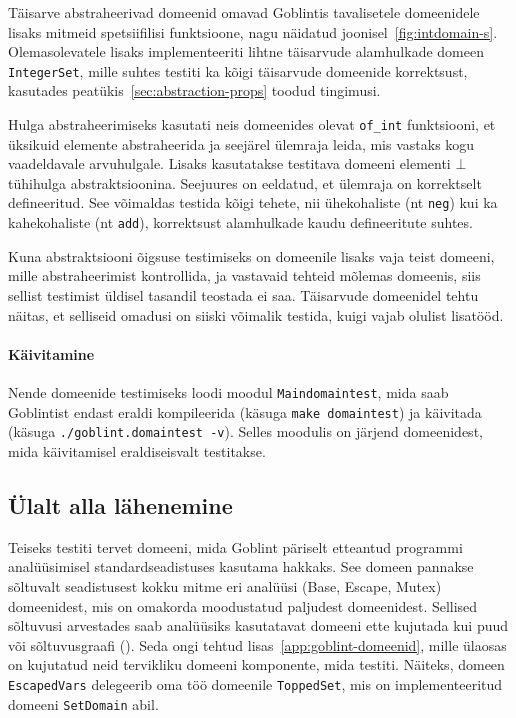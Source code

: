 \documentclass[../thesis.tex]{subfiles}
\begin{document}
Täisarve abstraheerivad domeenid omavad Goblintis tavalisetele domeenidele lisaks mitmeid spetsiifilisi funktsioone, nagu näidatud joonisel~\ref{fig:intdomain-s}.
Olemasolevatele lisaks implementeeriti lihtne täisarvude alamhulkade domeen \texttt{IntegerSet}, mille suhtes testiti ka kõigi täisarvude domeenide korrektsust, kasutades peatükis~\ref{sec:abstraction-props} toodud tingimusi.

Hulga abstraheerimiseks kasutati neis domeenides olevat \texttt{of\_int} funktsiooni, et üksikuid elemente abstraheerida ja seejärel ülemraja leida, mis vastaks kogu vaadeldavale arvuhulgale. Lisaks kasutatakse testitava domeeni elementi $\bot$ tühihulga abstraktsioonina. Seejuures on eeldatud, et ülemraja on korrektselt defineeritud. See võimaldas testida kõigi tehete, nii ühekohaliste (nt \texttt{neg}) kui ka kahekohaliste (nt \texttt{add}), korrektsust alamhulkade kaudu defineeritute suhtes.

Kuna abstraktsiooni õigsuse testimiseks on domeenile lisaks vaja teist domeeni, mille abstraheerimist kontrollida, ja vastavaid tehteid mõlemas domeenis, siis sellist testimist üldisel tasandil teostada ei saa. Täisarvude domeenidel tehtu näitas, et selliseid omadusi on siiski võimalik testida, kuigi vajab olulist lisatööd.

\paragraph{Käivitamine}
Nende domeenide testimiseks loodi moodul \texttt{Maindomaintest}, mida saab Goblintist endast eraldi kompileerida (käsuga \texttt{make domaintest}) ja käivitada (käsuga \texttt{./goblint.domaintest -v}). Selles moodulis on järjend domeenidest, mida käivitamisel eraldiseisvalt testitakse.

\subsection{Ülalt alla lähenemine}
Teiseks testiti tervet domeeni, mida Goblint päriselt etteantud programmi analüüsimisel standardseadistuses kasutama hakkaks. See domeen pannakse sõltuvalt seadistusest kokku mitme eri analüüsi (Base, Escape, Mutex) domeenidest, mis on omakorda moodustatud paljudest domeenidest. Sellised sõltuvusi arvestades saab analüüsiks kasutatavat domeeni ette kujutada kui puud või sõltuvusgraafi (). Seda ongi tehtud lisas~\ref{app:goblint-domeenid}, mille ülaosas on kujutatud neid tervikliku domeeni komponente, mida testiti.
Näiteks, domeen \texttt{EscapedVars} delegeerib oma töö domeenile \texttt{ToppedSet}, mis on implementeeritud domeeni \texttt{SetDomain} abil.
\end{document}
